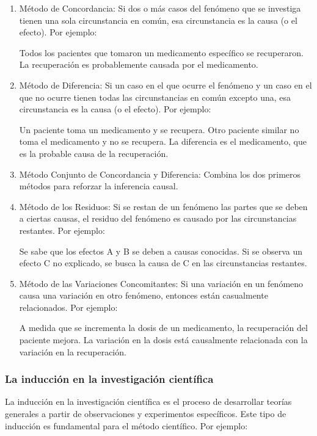 \begin{enumerate}
   \item Método de Concordancia: Si dos o más casos del fenómeno que se investiga tienen una sola circunstancia en común, esa circunstancia es la causa (o el efecto). Por ejemplo:
         
         Todos los pacientes que tomaron un medicamento específico se recuperaron. La recuperación es probablemente causada por el medicamento.
         
   \item Método de Diferencia: Si un caso en el que ocurre el fenómeno y un caso en el que no ocurre tienen todas las circunstancias en común excepto una, esa circunstancia es la causa (o el efecto). Por ejemplo:
         
         Un paciente toma un medicamento y se recupera. Otro paciente similar no toma el medicamento y no se recupera. La diferencia es el medicamento, que es la probable causa de la recuperación.
         
   \item Método Conjunto de Concordancia y Diferencia: Combina los dos primeros métodos para reforzar la inferencia causal.
   \item Método de los Residuos: Si se restan de un fenómeno las partes que se deben a ciertas causas, el residuo del fenómeno es causado por las circunstancias restantes. Por ejemplo:
         
         Se sabe que los efectos A y B se deben a causas conocidas. Si se observa un efecto C no explicado, se busca la causa de C en las circunstancias restantes.
         
   \item Método de las Variaciones Concomitantes: Si una variación en un fenómeno causa una variación en otro fenómeno, entonces están casualmente relacionados. Por ejemplo:
         
         A medida que se incrementa la dosis de un medicamento, la recuperación del paciente mejora. La variación en la dosis está causalmente relacionada con la variación en la recuperación.
\end{enumerate}

\subsubsection{La inducción en la investigación científica}
La inducción en la investigación científica es el proceso de desarrollar teorías generales a partir de observaciones y experimentos específicos. Este tipo de inducción es fundamental para el método científico. Por ejemplo:

